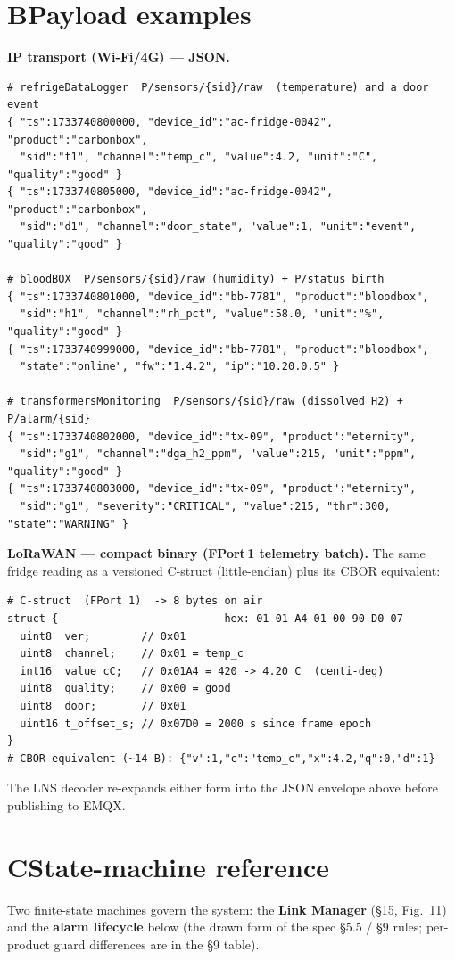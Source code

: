 \section*{B\quad Payload examples}
\textbf{IP transport (Wi-Fi/4G) — JSON.}
\begin{lstlisting}[style=js]
# refrigeDataLogger  P/sensors/{sid}/raw  (temperature) and a door event
{ "ts":1733740800000, "device_id":"ac-fridge-0042", "product":"carbonbox",
  "sid":"t1", "channel":"temp_c", "value":4.2, "unit":"C", "quality":"good" }
{ "ts":1733740805000, "device_id":"ac-fridge-0042", "product":"carbonbox",
  "sid":"d1", "channel":"door_state", "value":1, "unit":"event", "quality":"good" }

# bloodBOX  P/sensors/{sid}/raw (humidity) + P/status birth
{ "ts":1733740801000, "device_id":"bb-7781", "product":"bloodbox",
  "sid":"h1", "channel":"rh_pct", "value":58.0, "unit":"%", "quality":"good" }
{ "ts":1733740999000, "device_id":"bb-7781", "product":"bloodbox",
  "state":"online", "fw":"1.4.2", "ip":"10.20.0.5" }

# transformersMonitoring  P/sensors/{sid}/raw (dissolved H2) + P/alarm/{sid}
{ "ts":1733740802000, "device_id":"tx-09", "product":"eternity",
  "sid":"g1", "channel":"dga_h2_ppm", "value":215, "unit":"ppm", "quality":"good" }
{ "ts":1733740803000, "device_id":"tx-09", "product":"eternity",
  "sid":"g1", "severity":"CRITICAL", "value":215, "thr":300, "state":"WARNING" }
\end{lstlisting}
\textbf{LoRaWAN — compact binary (FPort\,1 telemetry batch).} The same fridge reading as a versioned
C-struct (little-endian) plus its CBOR equivalent:
\begin{lstlisting}[style=js]
# C-struct  (FPort 1)  -> 8 bytes on air
struct {                          hex: 01 01 A4 01 00 90 D0 07
  uint8  ver;        // 0x01
  uint8  channel;    // 0x01 = temp_c
  int16  value_cC;   // 0x01A4 = 420 -> 4.20 C  (centi-deg)
  uint8  quality;    // 0x00 = good
  uint8  door;       // 0x01
  uint16 t_offset_s; // 0x07D0 = 2000 s since frame epoch
}
# CBOR equivalent (~14 B): {"v":1,"c":"temp_c","x":4.2,"q":0,"d":1}
\end{lstlisting}
The LNS decoder re-expands either form into the JSON envelope above before publishing to EMQX.

\section*{C\quad State-machine reference}
Two finite-state machines govern the system: the \textbf{Link Manager} (\S15, Fig.~11) and the
\textbf{alarm lifecycle} below (the drawn form of the spec \S5.5 / \S9 rules; per-product guard
differences are in the \S9 table).

